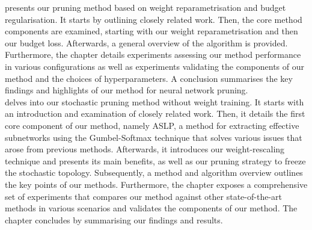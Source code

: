  presents our pruning method based on weight
reparametrisation and budget regularisation. It starts by outlining closely
related work. Then, the core method components are examined, starting with our
weight reparametrisation and then our budget loss. Afterwards, a general
overview of the algorithm is provided. Furthermore, the chapter details
experiments assessing our method performance in various configurations as well
as experiments validating the components of our method and the choices of
hyperparameters. A conclusion summarises the key findings and highlights of our
method for neural network pruning.\\

 delves into our stochastic pruning method without weight
training. It starts with an introduction and examination of closely related
work. Then, it details the first core component of our method, namely
\acl{ASLP}, a method for extracting effective subnetworks using the
Gumbel-Softmax technique that solves various issues that arose from previous
methods. Afterwards, it introduces our weight-rescaling technique and presents
its main benefits, as well as our pruning strategy to freeze the stochastic
topology. Subsequently, a method and algorithm overview outlines the key points
of our methods. Furthermore, the chapter exposes a comprehensive set of
experiments that compares our method against other state-of-the-art methods in
various scenarios and validates the components of our method. The chapter
concludes by summarising our findings and results.\\